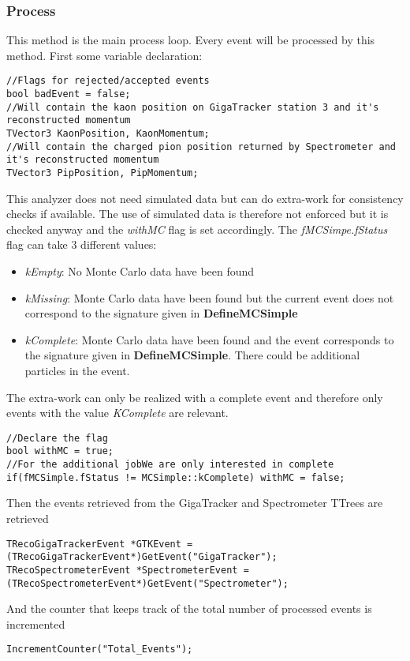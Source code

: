 \documentclass{article}
\newcommand{\method}[1]{\textbf{#1}}
\newcommand{\var}[1]{\textit{#1}}
\begin{document}
\subsubsection{Process}
This method is the main process loop. Every event will be processed by this method. First some
variable declaration:
\begin{lstlisting}
//Flags for rejected/accepted events
bool badEvent = false;
//Will contain the kaon position on GigaTracker station 3 and it's reconstructed momentum
TVector3 KaonPosition, KaonMomentum;
//Will contain the charged pion position returned by Spectrometer and it's reconstructed momentum 
TVector3 PipPosition, PipMomentum;
\end{lstlisting}

This analyzer does not need simulated data but can do extra-work for consistency checks if
available. The use of simulated data is therefore not enforced but it is checked anyway and the
\var{withMC} flag is set accordingly. The \var{fMCSimpe.fStatus} flag can take 3 different values:
\begin{itemize}
  \item \var{kEmpty}: No Monte Carlo data have been found
  \item \var{kMissing}: Monte Carlo data have been found but the current event does not correspond
  to the signature given in \method{DefineMCSimple} 
  \item \var{kComplete}: Monte Carlo data have been found and the event corresponds to the signature
  given in \method{DefineMCSimple}. There could be additional particles in the event.
\end{itemize}
The extra-work can only be realized with a complete event and therefore only events with the value
\var{KComplete} are relevant.

\begin{lstlisting}
//Declare the flag
bool withMC = true;
//For the additional jobWe are only interested in complete 
if(fMCSimple.fStatus != MCSimple::kComplete) withMC = false;
\end{lstlisting}

Then the events retrieved from the GigaTracker and Spectrometer TTrees are retrieved
\begin{lstlisting}
TRecoGigaTrackerEvent *GTKEvent = (TRecoGigaTrackerEvent*)GetEvent("GigaTracker");
TRecoSpectrometerEvent *SpectrometerEvent = (TRecoSpectrometerEvent*)GetEvent("Spectrometer");
\end{lstlisting}

And the counter that keeps track of the total number of processed events is incremented
\begin{lstlisting}
IncrementCounter("Total_Events");
\end{lstlisting}
\end{document}
